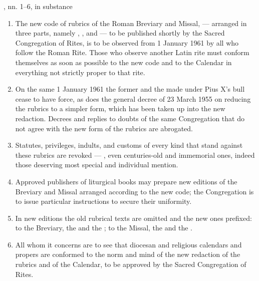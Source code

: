 \begin{studybox}{, nn. 1--6, in substance}
\begin{enumerate}[leftmargin=1.5em, itemsep=0.25em]
\item The new code of rubrics of the Roman Breviary and Missal,  — arranged in three parts, namely , , and  — to be published
shortly by the Sacred Congregation of Rites, is to be observed from 1 January 1961 by all who
follow the Roman Rite. Those who observe another Latin rite must conform themselves as soon as
possible to the new code and to the Calendar in everything not strictly proper to that rite.
\item On the same 1 January 1961 the former  and the  made under Pius X's bull  cease to have force, as does the general decree of 23 March 1955 on reducing the
rubrics to a simpler form, which has been taken up into the new redaction. Decrees and replies
to doubts of the same Congregation that do not agree with the new form of the rubrics are
abrogated.
\item Statutes, privileges, indults, and customs of every kind that stand against these rubrics
are revoked — , even centuries-old and immemorial ones, indeed those deserving most special
and individual mention.
\item Approved publishers of liturgical books may prepare new editions of the Breviary and
Missal arranged according to the new code; the Congregation is to issue particular instructions
to secure their uniformity.
\item In new editions the old rubrical texts are omitted and the new ones prefixed: to the
Breviary, the  and the ;
to the Missal, the  and the .
\item All whom it concerns are to see that diocesan and religious calendars and propers are
conformed to the norm and mind of the new redaction of the rubrics and of the Calendar, to be
approved by the Sacred Congregation of Rites.
\end{enumerate}
\end{studybox}

